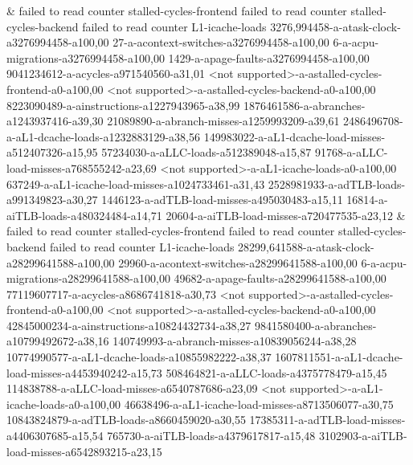 &
failed to read counter stalled-cycles-frontend failed to read counter stalled-cycles-backend failed to read counter L1-icache-loads 3276,994458-a-atask-clock-a3276994458-a100,00 27-a-acontext-switches-a3276994458-a100,00 6-a-acpu-migrations-a3276994458-a100,00 1429-a-apage-faults-a3276994458-a100,00 9041234612-a-acycles-a971540560-a31,01 <not supported>-a-astalled-cycles-frontend-a0-a100,00 <not supported>-a-astalled-cycles-backend-a0-a100,00 8223090489-a-ainstructions-a1227943965-a38,99 1876461586-a-abranches-a1243937416-a39,30 21089890-a-abranch-misses-a1259993209-a39,61 2486496708-a-aL1-dcache-loads-a1232883129-a38,56 149983022-a-aL1-dcache-load-misses-a512407326-a15,95 57234030-a-aLLC-loads-a512389048-a15,87 91768-a-aLLC-load-misses-a768555242-a23,69 <not supported>-a-aL1-icache-loads-a0-a100,00 637249-a-aL1-icache-load-misses-a1024733461-a31,43 2528981933-a-adTLB-loads-a991349823-a30,27 1446123-a-adTLB-load-misses-a495030483-a15,11 16814-a-aiTLB-loads-a480324484-a14,71 20604-a-aiTLB-load-misses-a720477535-a23,12
&
failed to read counter stalled-cycles-frontend failed to read counter stalled-cycles-backend failed to read counter L1-icache-loads 28299,641588-a-atask-clock-a28299641588-a100,00 29960-a-acontext-switches-a28299641588-a100,00 6-a-acpu-migrations-a28299641588-a100,00 49682-a-apage-faults-a28299641588-a100,00 77119607717-a-acycles-a8686741818-a30,73 <not supported>-a-astalled-cycles-frontend-a0-a100,00 <not supported>-a-astalled-cycles-backend-a0-a100,00 42845000234-a-ainstructions-a10824432734-a38,27 9841580400-a-abranches-a10799492672-a38,16 140749993-a-abranch-misses-a10839056244-a38,28 10774990577-a-aL1-dcache-loads-a10855982222-a38,37 1607811551-a-aL1-dcache-load-misses-a4453940242-a15,73 508464821-a-aLLC-loads-a4375778479-a15,45 114838788-a-aLLC-load-misses-a6540787686-a23,09 <not supported>-a-aL1-icache-loads-a0-a100,00 46638496-a-aL1-icache-load-misses-a8713506077-a30,75 10843824879-a-adTLB-loads-a8660459020-a30,55 17385311-a-adTLB-load-misses-a4406307685-a15,54 765730-a-aiTLB-loads-a4379617817-a15,48 3102903-a-aiTLB-load-misses-a6542893215-a23,15
